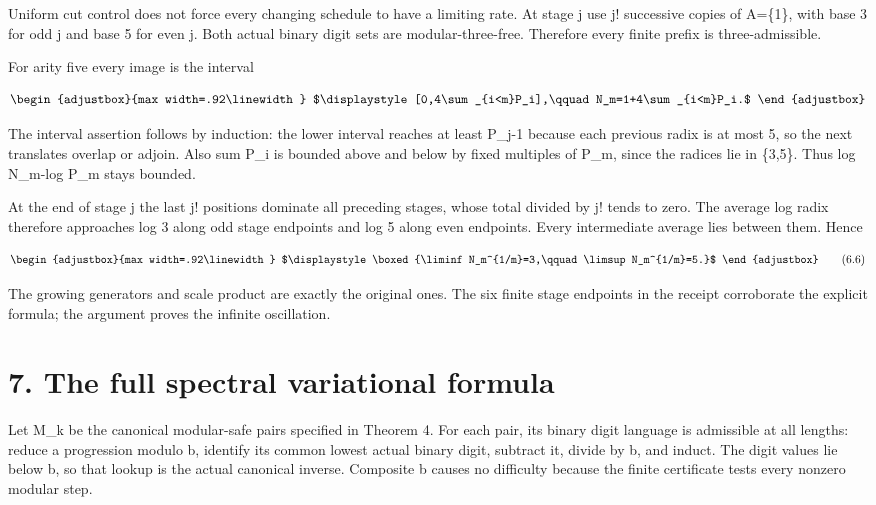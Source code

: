 Uniform cut control does not force every changing schedule to have a limiting rate. At stage j use j! successive copies of A=\{1\}, with base 3 for odd j and base 5 for even j. Both actual binary digit sets are modular-three-free. Therefore every finite prefix is three-admissible.

For arity five every image is the interval

\[
\begin{adjustbox}{max width=.92\linewidth}
$\displaystyle [0,4\sum_{i<m}P_i],\qquad N_m=1+4\sum_{i<m}P_i.$
\end{adjustbox}
\]

The interval assertion follows by induction: the lower interval reaches at least P\_j-1 because each previous radix is at most 5, so the next translates overlap or adjoin. Also sum P\_i is bounded above and below by fixed multiples of P\_m, since the radices lie in \{3,5\}. Thus log N\_m-log P\_m stays bounded.

At the end of stage j the last j! positions dominate all preceding stages, whose total divided by j! tends to zero. The average log radix therefore approaches log 3 along odd stage endpoints and log 5 along even endpoints. Every intermediate average lies between them. Hence

\[
\begin{adjustbox}{max width=.92\linewidth}
$\displaystyle \boxed{\liminf N_m^{1/m}=3,\qquad\limsup N_m^{1/m}=5.}$
\end{adjustbox}
\tag{6.6}
\]

The growing generators and scale product are exactly the original ones. The six finite stage endpoints in the receipt corroborate the explicit formula; the argument proves the infinite oscillation.

\section{7. The full spectral variational formula}\label{n24-the-full-spectral-variational-formula}

Let M\_k be the canonical modular-safe pairs specified in Theorem 4. For each pair, its binary digit language is admissible at all lengths: reduce a progression modulo b, identify its common lowest actual binary digit, subtract it, divide by b, and induct. The digit values lie below b, so that lookup is the actual canonical inverse. Composite b causes no difficulty because the finite certificate tests every nonzero modular step.

